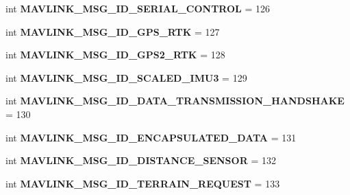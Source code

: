 \begin{DoxyCompactItemize}
int {\bfseries M\+A\+V\+L\+I\+N\+K\+\_\+\+M\+S\+G\+\_\+\+I\+D\+\_\+\+S\+E\+R\+I\+A\+L\+\_\+\+C\+O\+N\+T\+R\+OL} = 126
\item 
\mbox{\label{namespacepymavlink_1_1dialects_1_1v10_a8ed26ef2b9190d74a1d00e01fef6aae2}} 
int {\bfseries M\+A\+V\+L\+I\+N\+K\+\_\+\+M\+S\+G\+\_\+\+I\+D\+\_\+\+G\+P\+S\+\_\+\+R\+TK} = 127
\item 
\mbox{\label{namespacepymavlink_1_1dialects_1_1v10_a785576cc48bb79f3f83434eccd62d197}} 
int {\bfseries M\+A\+V\+L\+I\+N\+K\+\_\+\+M\+S\+G\+\_\+\+I\+D\+\_\+\+G\+P\+S2\+\_\+\+R\+TK} = 128
\item 
\mbox{\label{namespacepymavlink_1_1dialects_1_1v10_ac4d6fb18be5f62d97b8faa8eb702d933}} 
int {\bfseries M\+A\+V\+L\+I\+N\+K\+\_\+\+M\+S\+G\+\_\+\+I\+D\+\_\+\+S\+C\+A\+L\+E\+D\+\_\+\+I\+M\+U3} = 129
\item 
\mbox{\label{namespacepymavlink_1_1dialects_1_1v10_a5dc632fac98a866bbe6352905852ca5f}} 
int {\bfseries M\+A\+V\+L\+I\+N\+K\+\_\+\+M\+S\+G\+\_\+\+I\+D\+\_\+\+D\+A\+T\+A\+\_\+\+T\+R\+A\+N\+S\+M\+I\+S\+S\+I\+O\+N\+\_\+\+H\+A\+N\+D\+S\+H\+A\+KE} = 130
\item 
\mbox{\label{namespacepymavlink_1_1dialects_1_1v10_aff1cd67fcb7e45b88d55abddd1d6c6a7}} 
int {\bfseries M\+A\+V\+L\+I\+N\+K\+\_\+\+M\+S\+G\+\_\+\+I\+D\+\_\+\+E\+N\+C\+A\+P\+S\+U\+L\+A\+T\+E\+D\+\_\+\+D\+A\+TA} = 131
\item 
\mbox{\label{namespacepymavlink_1_1dialects_1_1v10_a8ccf3810abda591de05fb73c0ad1af2b}} 
int {\bfseries M\+A\+V\+L\+I\+N\+K\+\_\+\+M\+S\+G\+\_\+\+I\+D\+\_\+\+D\+I\+S\+T\+A\+N\+C\+E\+\_\+\+S\+E\+N\+S\+OR} = 132
\item 
\mbox{\label{namespacepymavlink_1_1dialects_1_1v10_a4ee5f23481638740bc5af6f3391c1d57}} 
int {\bfseries M\+A\+V\+L\+I\+N\+K\+\_\+\+M\+S\+G\+\_\+\+I\+D\+\_\+\+T\+E\+R\+R\+A\+I\+N\+\_\+\+R\+E\+Q\+U\+E\+ST} = 133
\item 
\mbox{\label{namespacepymavlink_1_1dialects_1_1v10_a5479f32e7e9cc31cad4464ac22c817e0}} 

\end{DoxyCompactItemize}
